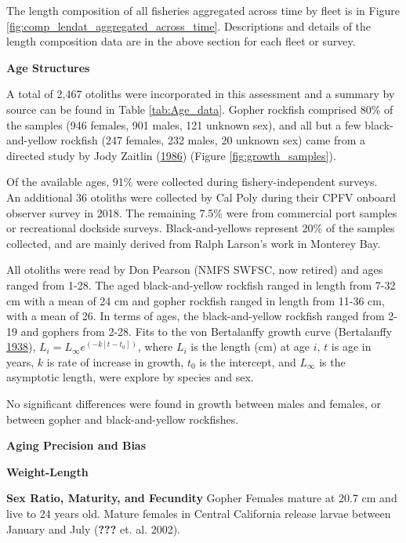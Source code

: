 \documentclass[12pt,]{article}
\begin{document}
The length composition of all fisheries aggregated across time by fleet
is in Figure \ref{fig:comp_lendat_aggregated_across_time}. Descriptions
and details of the length composition data are in the above section for
each fleet or survey.

\vspace{.5cm} \textbf{Age Structures}

A total of 2,467 otoliths were incorporated in this assessment and a
summary by source can be found in Table \ref{tab:Age_data}. Gopher
rockfish comprised 80\% of the samples (946 females, 901 males, 121
unknown sex), and all but a few black-and-yellow rockfish (247 females,
232 males, 20 unknown sex) came from a directed study by Jody Zaitlin
(\protect\hyperlink{ref-Zaitlin1986}{1986}) (Figure
\ref{fig:growth_samples}).

Of the available ages, 91\% were collected during fishery-independent
surveys.\\
An additional 36 otoliths were collected by Cal Poly during their CPFV
onboard observer survey in 2018. The remaining 7.5\% were from
commercial port samples or recreational dockside surveys.
Black-and-yellows represent 20\% of the samples collected, and are
mainly derived from Ralph Larson's work in Monterey Bay.

All otoliths were read by Don Pearson (NMFS SWFSC, now retired) and ages
ranged from 1-28. The aged black-and-yellow rockfish ranged in length
from 7-32 cm with a mean of 24 cm and gopher rockfish ranged in length
from 11-36 cm, with a mean of 26. In terms of ages, the black-and-yellow
rockfish ranged from 2-19 and gophers from 2-28. Fits to the von
Bertalanffy growth curve (Bertalanffy
\protect\hyperlink{ref-vonB1938}{1938}),
\(L_i = L_{\infty}e^{(-k[t-t_0])}\), where \(L_i\) is the length (cm) at
age \(i\), \(t\) is age in years, \(k\) is rate of increase in growth,
\(t_0\) is the intercept, and \(L_{\infty}\) is the asymptotic length,
were explore by species and sex.

No significant differences were found in growth between males and
females, or between gopher and black-and-yellow rockfishes.

\vspace{.5cm} \textbf{Aging Precision and Bias}

\vspace{.5cm} \textbf{Weight-Length}

\vspace{.5cm} \textbf{Sex Ratio, Maturity, and Fecundity} Gopher Females
mature at 20.7 cm and live to 24 years old. Mature females in Central
California release larvae between January and July ({\textbf{???}} et.
al. 2002).
\end{document}
